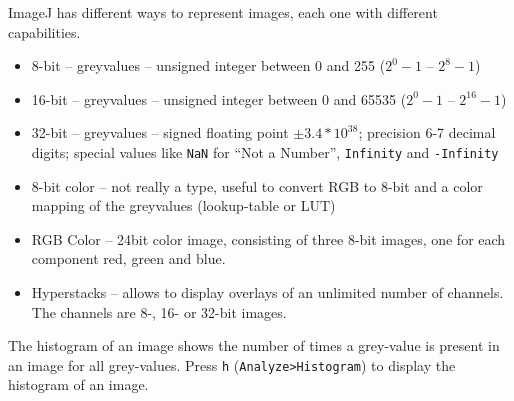 ImageJ has different ways to represent images, each one with different capabilities.

\begin{itemize}
\item 8-bit -- greyvalues -- unsigned integer between 0 and 255 ($2^0-1$ -- $2^8-1$)
\item 16-bit -- greyvalues -- unsigned integer between 0 and 65535 ($2^0-1$ -- $2^{16}-1$)
\item 32-bit -- greyvalues -- signed floating point $\pm 3.4 * 10^{38}$; precision 6-7 decimal digits; special values like \texttt{NaN} for “Not a Number”, \texttt{Infinity} and \texttt{-Infinity}
\item 8-bit color -- not really a type, useful to convert RGB to 8-bit and a color mapping of the
 greyvalues (lookup-table or LUT)
\item RGB Color -- 24bit color image, consisting of three 8-bit images, one for each component
 red, green and blue.
\item Hyperstacks -- allows to display overlays of an unlimited number of channels. The channels
 are 8-, 16- or 32-bit images.
\end{itemize}

The histogram of an image shows the number of times a grey-value is present in an image for all
grey-values. Press \texttt{h} (\texttt{Analyze>Histogram}) to display the histogram of an image.

